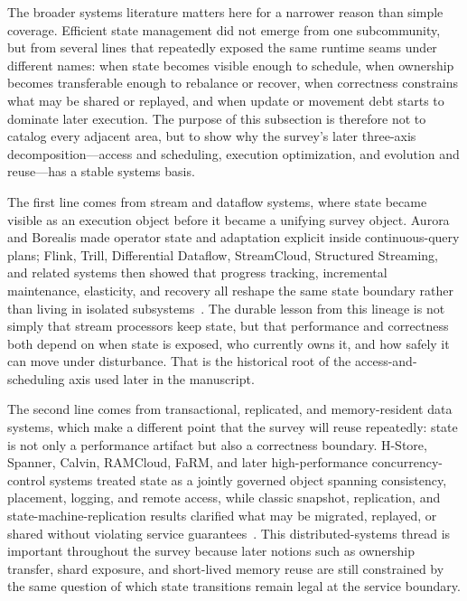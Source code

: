 \documentclass[acmsmall,screen,review]{acmart}
\begin{document}
The broader systems literature matters here for a narrower reason than simple coverage. Efficient state management did not emerge from one subcommunity, but from several lines that repeatedly exposed the same runtime seams under different names: when state becomes visible enough to schedule, when ownership becomes transferable enough to rebalance or recover, when correctness constrains what may be shared or replayed, and when update or movement debt starts to dominate later execution. The purpose of this subsection is therefore not to catalog every adjacent area, but to show why the survey's later three-axis decomposition---access and scheduling, execution optimization, and evolution and reuse---has a stable systems basis.

The first line comes from stream and dataflow systems, where state became visible as an execution object before it became a unifying survey object. Aurora and Borealis made operator state and adaptation explicit inside continuous-query plans; Flink, Trill, Differential Dataflow, StreamCloud, Structured Streaming, and related systems then showed that progress tracking, incremental maintenance, elasticity, and recovery all reshape the same state boundary rather than living in isolated subsystems~\cite{abadi2003aurora,abadi2005borealis,carbone2015flink,carbone2015asynchronous,chandramouli2014trill,armbrust2018structured,murray2013differential,gulisano2012streamcloud,hirzel2014catalog,cugola2012processing}. The durable lesson from this lineage is not simply that stream processors keep state, but that performance and correctness both depend on when state is exposed, who currently owns it, and how safely it can move under disturbance. That is the historical root of the access-and-scheduling axis used later in the manuscript.

The second line comes from transactional, replicated, and memory-resident data systems, which make a different point that the survey will reuse repeatedly: state is not only a performance artifact but also a correctness boundary. H-Store, Spanner, Calvin, RAMCloud, FaRM, and later high-performance concurrency-control systems treated state as a jointly governed object spanning consistency, placement, logging, and remote access, while classic snapshot, replication, and state-machine-replication results clarified what may be migrated, replayed, or shared without violating service guarantees~\cite{kallman2008hstore,corbett2012spanner,thomson2012calvin,ousterhout2011ramcloud,dragojevic2014farm,ren2015drtmh,yu2016tictoc,zamanian2017endmyth,schneider1990state,chandy1985snapshot,ongaro2014raft}. This distributed-systems thread is important throughout the survey because later notions such as ownership transfer, shard exposure, and short-lived memory reuse are still constrained by the same question of which state transitions remain legal at the service boundary.
\end{document}

